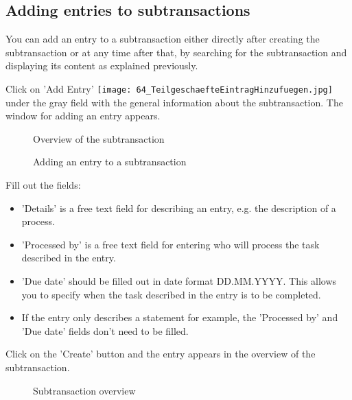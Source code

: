 \subsection{Adding entries to subtransactions}

You can add an entry to a subtransaction either directly after creating the subtransaction or at any time after that, by searching for the subtransaction and displaying its content as explained previously.

Click on 'Add Entry' \texttt{[image: 64\_TeilgeschaefteEintragHinzufuegen.jpg]}  under the gray field with the general information about the subtransaction. The window for adding an entry appears.

\begin{figure}[H]
\caption{Overview of the subtransaction}
\end{figure}

\begin{figure}[H]
\caption{Adding an entry to a subtransaction}
\end{figure}

Fill out the fields:

\begin{itemize}
\item
'Details'  is a free text field for describing an entry, e.g. the description of a process.
\item
'Processed by'  is a free text field for entering who will process the task described in the entry.
\item
'Due date'  should be filled out in date format DD.MM.YYYY. This allows you to specify when the task described in the entry is to be completed.
\item
If the entry only describes a statement for example, the 'Processed by' and 'Due date' fields don't need to be filled.
\end{itemize}

Click on the 'Create' button  and the entry appears in the overview of the subtransaction.

\begin{figure}[H]
\caption{Subtransaction overview}
\end{figure}

